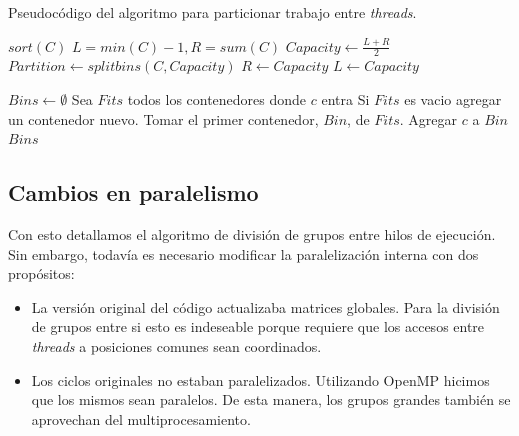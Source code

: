 \begin{algorithm}[H]
    \caption{Pseudoc\'odigo del algoritmo para particionar trabajo entre \textit{threads}.}
    \label{algo:partition-algo}
    \begin{algorithmic}
            \State $sort(C)$
            \State $L = min(C)-1, R = sum(C)$
                \Comment{Invariante: $(L, \dots, R]$ contiene la capacidad m\'axima.}
                \State $Capacity \gets \frac{L+R}{2}$
                \State $Partition \gets splitbins(C,Capacity)$
                    \State $R \gets Capacity$
                \Else
                    \State $L \gets Capacity$
                \EndIf
            \EndWhile

            \State {}
        \EndFunction

            \State $Bins \gets \emptyset$
                \State Sea $Fits$ todos los contenedores donde $c$ entra
                \State Si $Fits$ es vacio agregar un contenedor nuevo.
                \State Tomar el primer contenedor, $Bin$, de $Fits$.
                \State Agregar $c$ a $Bin$
            \EndFor
            \State \Return $Bins$
        \EndFunction
    \end{algorithmic}
\end{algorithm}

\subsection{Cambios en paralelismo}

Con esto detallamos el algoritmo de divisi\'on de grupos entre hilos de ejecuci\'on.
Sin embargo, todav\'ia es necesario modificar la paralelizaci\'on interna con dos
prop\'ositos:

\begin{itemize}
    \item La versi\'on original del c\'odigo actualizaba matrices globales. Para
    la divisi\'on de grupos entre si esto es indeseable porque requiere que los
    accesos entre \textit{threads} a posiciones comunes sean coordinados.
    \item Los ciclos originales no estaban paralelizados. Utilizando OpenMP
    hicimos que los mismos sean paralelos. De esta manera, los grupos grandes
    tambi\'en se aprovechan del multiprocesamiento.
\end{itemize}

